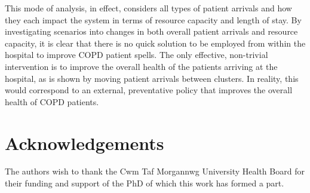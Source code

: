 \documentclass[11pt]{article}
\begin{document}
This mode of analysis, in effect, considers all types of patient arrivals and
how they each impact the system in terms of resource capacity and length of
stay. By investigating scenarios into changes in both overall patient arrivals
and resource capacity, it is clear that there is no quick solution to be
employed from within the hospital to improve COPD patient spells. The only
effective, non-trivial intervention is to improve the overall health of the
patients arriving at the hospital, as is shown by moving patient arrivals
between clusters. In reality, this would correspond to an external, preventative
policy that improves the overall health of COPD patients.

\section*{Acknowledgements}

The authors wish to thank the Cwm Taf Morgannwg University Health Board for
their funding and support of the PhD of which this work has formed a part.
\end{document}

